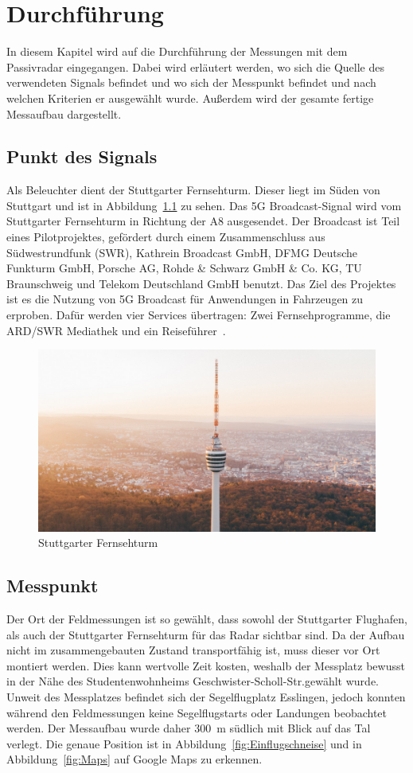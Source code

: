 \chapter{Durchführung}
In diesem Kapitel wird auf die Durchführung der Messungen mit dem Passivradar eingegangen. Dabei wird erläutert werden, wo sich die Quelle des verwendeten Signals befindet und wo sich der Messpunkt befindet und nach welchen Kriterien er ausgewählt wurde. Außerdem wird der gesamte fertige Messaufbau dargestellt.
\section{Punkt des Signals}
Als Beleuchter dient der Stuttgarter Fernsehturm. Dieser liegt im Süden von Stuttgart und ist in Abbildung~\ref{fig:Fernsehturm} zu sehen. Das 5G Broadcast-Signal wird vom Stuttgarter Fernsehturm in Richtung der A8 ausgesendet. Der Broadcast ist Teil eines Pilotprojektes, gefördert durch einem Zusammenschluss aus Südwestrundfunk (SWR), Kathrein Broadcast GmbH,  DFMG  Deutsche Funkturm GmbH, Porsche AG, Rohde \& Schwarz GmbH \& Co. KG, TU Braunschweig und Telekom Deutschland GmbH benutzt. Das Ziel des Projektes ist es die Nutzung von 5G Broadcast für Anwendungen in Fahrzeugen zu erproben. Dafür werden vier Services übertragen: Zwei Fernsehprogramme, die ARD/SWR Mediathek und ein Reiseführer~\cite{5GMAG2020}.
\begin{figure}
    \centering
    \includegraphics[width=\textwidth]{images/Fernsehturm.jpg}
    \caption{Stuttgarter Fernsehturm}\label{fig:Fernsehturm}
\end{figure}

\section{Messpunkt}
Der Ort der Feldmessungen ist so gewählt, dass sowohl der Stuttgarter Flughafen, als auch der Stuttgarter Fernsehturm für das Radar sichtbar sind. Da der Aufbau nicht im zusammengebauten Zustand transportfähig ist, muss dieser vor Ort montiert werden. Dies kann wertvolle Zeit kosten, weshalb der Messplatz bewusst in der Nähe des Studentenwohnheims Geschwister-Scholl-Str.\@ gewählt wurde. Unweit des Messplatzes befindet sich der Segelflugplatz Esslingen, jedoch konnten während den Feldmessungen keine Segelflugstarts oder Landungen beobachtet werden. Der Messaufbau wurde daher \SI{300}{\metre} südlich mit Blick auf das Tal verlegt. Die genaue Position ist in Abbildung~\ref{fig:Einflugschneise} und in Abbildung~\ref{fig:Maps} auf Google Maps zu erkennen.

